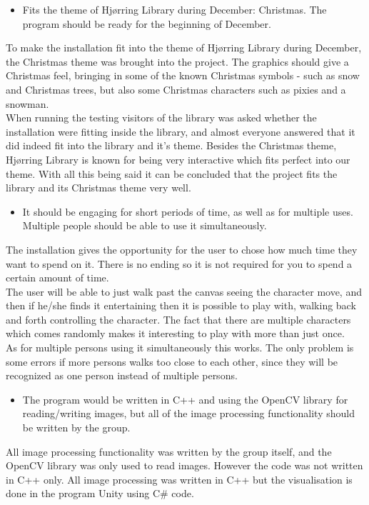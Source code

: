\begin{itemize}
\item Fits the theme of Hj{\o}rring Library during December: Christmas. The program should be ready for the beginning of December.
\end{itemize}
To make the installation fit into the theme of Hj{\o}rring Library during December, the Christmas theme was brought into the project. The graphics should give a Christmas feel, bringing in some of the known Christmas symbols - such as snow and Christmas trees, but also some Christmas characters such as pixies and a snowman.\\
When running the testing visitors of the library was asked whether the installation were fitting inside the library, and almost everyone answered that it did indeed fit into the library and it's theme.
Besides the Christmas theme, Hj{\o}rring Library is known for being very interactive which fits perfect into our theme. With all this being said it can be concluded that the project fits the library and its Christmas theme very well.
\begin{itemize}
\item It should be engaging for short periods of time, as well as for multiple uses. Multiple people should be able to use it simultaneously.
\end{itemize}
The installation gives the opportunity for the user to chose how much time they want to spend on it. There is no ending so it is not required for you to spend a certain amount of time. \\
The user will be able to just walk past the canvas seeing the character move, and then if he/she finds it entertaining then it is possible to play with, walking back and forth controlling the character. The fact that there are multiple characters which comes randomly makes it interesting to play with more than just once.\\
As for multiple persons using it simultaneously this works. The only problem is some errors if more persons walks too close to each other, since they will be recognized as one person instead of multiple persons.
\begin{itemize}
\item The program would be written in C++ and using the OpenCV library for reading/writing images, but all of the image processing functionality should be written by the group.
\end{itemize}
All image processing functionality was written by the group itself, and the OpenCV library was only used to read images. However the code was not written in C++ only. All image processing was written in C++ but the visualisation is done in the program Unity using C\# code.


